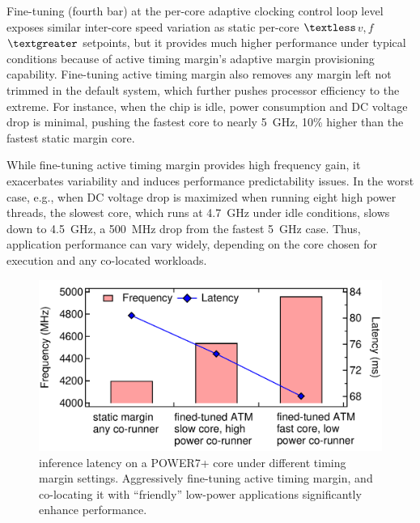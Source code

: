 Fine-tuning (fourth bar) at the per-core adaptive clocking control loop level exposes similar inter-core speed variation as static per-core $\textless$$v,f$$\textgreater$ setpoints, but it provides much higher performance under typical conditions because of active timing margin's adaptive margin provisioning capability. Fine-tuning active timing margin also removes any margin left not trimmed in the default system, which further pushes processor efficiency to the extreme. For instance, when the chip is idle, power consumption and DC voltage drop is minimal, pushing the fastest core to nearly 5~GHz, 10\% higher than the fastest static margin core.

While fine-tuning active timing margin provides high frequency gain, it exacerbates variability and induces performance predictability issues. In the worst case, e.g., when DC voltage drop is maximized when running eight high power {} threads, the slowest core, which runs at 4.7~GHz under idle conditions, slows down to 4.5~GHz, a 500~MHz drop from the fastest 5~GHz case. Thus, application performance can vary widely, depending on the core chosen for execution and any co-located workloads.

\begin{figure}[t]
  \centering
  \includegraphics[trim=0 0 0 0,clip,width=.75\linewidth]{graphs/process/noisy-latency.pdf}
  \caption{{} inference latency on a POWER7+ core under different timing margin settings. Aggressively fine-tuning active timing margin, and co-locating it with ``friendly'' low-power applications significantly enhance performance.}

  \label{fig:motivate-latency}
\end{figure}

